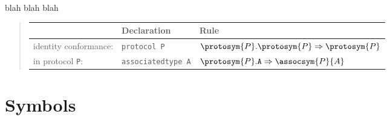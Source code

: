 \documentclass[../generics]{subfiles}
\begin{document}
blah blah blah
\begin{quote}
\begin{tabular}{lll}
\toprule
&\textbf{Declaration}&\textbf{Rule}\\
\midrule
identity conformance:&\texttt{protocol P}&$\protosym{P}.\protosym{P}\Rightarrow\protosym{P}$\\
in protocol \texttt{P}:&\texttt{associatedtype A}&$\protosym{P}.\texttt{A}\Rightarrow\assocsym{P}{A}$\\
\bottomrule
\end{tabular}
\end{quote}

\section{Symbols}\label{rqm symbols}
\end{document}
